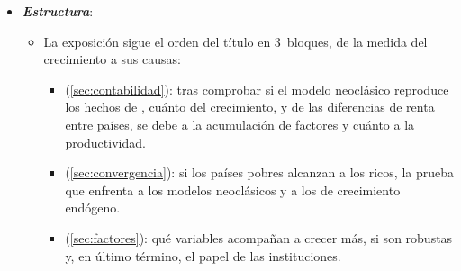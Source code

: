 \documentclass[11pt]{article}
\begin{document}
\begin{itemize}
\item \textbf{\emph{Estructura}}:
  \begin{itemize}
  \item La exposición sigue el orden del título en 3~bloques, de la medida del crecimiento a sus causas:
  \begin{itemize}
  \item {} (\ref{sec:contabilidad}): tras comprobar si el modelo neoclásico reproduce los hechos de , cuánto del crecimiento, y de las diferencias de renta entre países, se debe a la acumulación de factores y cuánto a la productividad.
  \item {} (\ref{sec:convergencia}): si los países pobres alcanzan a los ricos, la prueba que enfrenta a los modelos neoclásicos y a los de crecimiento endógeno.
  \item {} (\ref{sec:factores}): qué variables acompañan a crecer más, si son robustas y, en último término, el papel de las instituciones.
  \end{itemize}
  \end{itemize}
\end{itemize}
\end{document}
